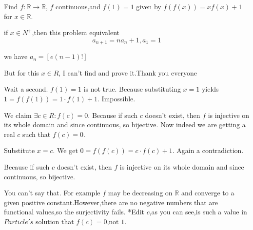 \begin{solution}
	\begin{tcolorbox}Find $f : \mathbb{R} \to \mathbb{R}$, $f$ continuous,and $f(1)=1$ given by  $f(f(x))=xf(x)+1$ for $x\in \mathbb{R}$.

if $x\in N^{+}$,then  this problem  equivalent
\[a_{n+1}=na_{n}+1,a_{1}=1\]

we have $a_{n}=[e(n-1)!]$

But for this $x\in R$, I can't find and prove it.Thank you everyone\end{tcolorbox}
Wait a second. $f(1)=1$ is not true. Because substituting $x=1$ yields $1=f(f(1))=1\cdot f(1)+1$. Impossible.

We claim $\exists c\in R:f(c)=0$. Because if such $c$ doesn't exist, then $f$ is injective on its whole domain and since continuous, so bijective. Now indeed we are getting a real $c$ such that $f(c)=0$.

Substitute $x=c$. We get $0=f(f(c))=c\cdot f(c)+1$. Again a contradiction.
\end{solution}






\begin{solution}
	\begin{tcolorbox}Because if such $c$ doesn't exist, then $f$ is injective on its whole domain and since continuous, so bijective.\end{tcolorbox}
You can't say that.
For example $f$ may be decreasing on $\mathbb R$ and converge to a given positive constant.However,there are no negative numbers that are functional values,so the surjectivity fails.
*Edit
$c$,as you can see,is such a value in $Particle's$ solution that $f(c)=0$,not $1$.
\end{solution}



